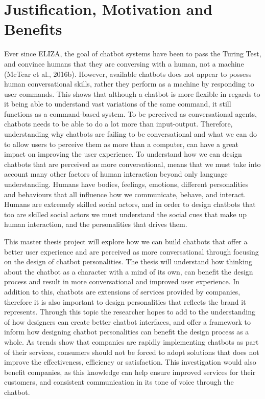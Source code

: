 \section{Justification, Motivation and Benefits}
Ever since ELIZA, the goal of chatbot systems have been to pass the Turing Test, and convince humans that they are conversing with a human, not a machine (McTear et al., 2016b). However, available chatbots does not appear to possess human conversational skills, rather they perform as a machine by responding to user commands. This shows that although a chatbot is more flexible in regards to it being able to understand vast variations of the same command, it still functions as a command-based system. To be perceived as conversational agents, chatbots needs to be able to do a lot more than input-output. Therefore, understanding why chatbots are failing to be conversational and what we can do to allow users to perceive them as more than a computer, can have a great impact on improving the user experience. To understand how we can design chatbots that are perceived as more conversational, means that we must take into account many other factors of human interaction beyond only language understanding. Humans have bodies, feelings, emotions, different personalities and behaviours that all influence how we communicate, behave, and interact. Humans are extremely skilled social actors, and in order to design chatbots that too are skilled social actors we must understand the social cues that make up human interaction, and the personalities that drives them. 

This master thesis project will explore how we can build chatbots that offer a better user experience and are perceived as more conversational through focusing on the design of chatbot personalities. The thesis will understand how thinking about the chatbot as a character with a mind of its own, can benefit the design process and result in more conversational and improved user experience. In addition to this, chatbots are extensions of services provided by companies, therefore it is also important to design personalities that reflects the brand it represents. Through this topic the researcher hopes to add to the understanding of how designers can create better chatbot interfaces, and offer a framework to inform how designing chatbot personalities can benefit the design process as a whole. As trends show that companies are rapidly implementing chatbots as part of their services, consumers should not be forced to adopt solutions that does not improve the effectiveness, efficiency or satisfaction. This investigation would also benefit companies, as this knowledge can help ensure improved services for their customers, and consistent communication in its tone of voice through the chatbot.

